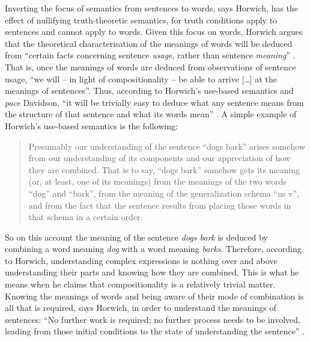 Inverting the focus of semantics from sentences to words, says Horwich, has the effect of nullifying truth-theoretic semantics, for truth conditions apply to sentences and cannot apply to words. Given this focus on words, Horwich argues that the theoretical characterisation of the meanings of words will be deduced from “certain facts concerning sentence \textit{usage}, rather than sentence \textit{meaning}” \citep[314, emphasis in original]{Horwich2008}. That is, once the meanings of words are deduced from observations of sentence usage, “we will – in light of compositionality – be able to arrive […] at the meanings of sentences”. Thus, according to Horwich’s use-based semantics and \textit{pace} Davidson, “it will be trivially easy to deduce what any sentence means from the structure of that sentence and what its words mean” \citep[314]{Horwich2008}. A simple example of Horwich’s use-based semantics is the following:
\begin{quote}
Presumably our understanding of the sentence “dogs bark” arises somehow from our understanding of its components and our appreciation of how they are combined. That is to say, “dogs bark” somehow gets its meaning (or, at least, one of its meanings) from the meanings of the two words “dog” and “bark”, from the meaning of the generalization schema “ns v”, and from the fact that the sentence results from placing those words in that schema in a certain order. \citep[154]{Horwich1998}
\end{quote}
So on this account the meaning of the sentence \textit{dogs bark} is deduced by combining a word meaning \textit{dog} with a word meaning \textit{barks}. Therefore, according to Horwich, understanding complex expressions is nothing over and above understanding their parts and knowing how they are combined. This is what he means when he claims that compositionality is a relatively trivial matter. Knowing the meanings of words and being aware of their mode of combination is all that is required, says Horwich, in order to understand the meanings of sentences: “No further work is required; no further process needs to be involved, leading from those initial conditions to the state of understanding the sentence” \citep[155]{Horwich1998}.

